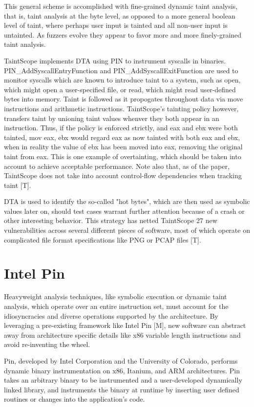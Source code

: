 \documentclass[11pt,expanded,copyright]{fsuthesis}
\begin{document}
This general scheme is accomplished with fine-grained dynamic taint analysis, that is, taint analysis at the byte level, as opposed to a more general boolean level of taint, where perhaps user input is tainted and all non-user input is untainted. As fuzzers evolve they appear to favor more and more finely-grained taint analysis.

TaintScope implements DTA using PIN to instrument syscalls in binaries. PIN\_AddSyscallEntryFunction and PIN\_AddSyscallExitFunction are used to monitor syscalls which are known to introduce taint to a system, such as open, which might open a user-specified file, or read, which might read user-defined bytes into memory. Taint is followed as it propogates throughout data via move instructions and arithmetic instructions. TaintScope's tainting policy however, transfers taint by unioning taint values whenver they both appear in an instruction. Thus, if the policy is enforced strictly, and eax and ebx were both tainted, mov eax, ebx would regard eax as now tainted with both eax and ebx, when in reality the value of ebx has been moved into eax, removing the original taint from eax. This is one example of overtainting, which should be taken into account to achieve acceptable performance. Note also that, as of the paper, TaintScope does not take into account control-flow dependencies when tracking taint [T].

DTA is used to identify the so-called "hot bytes", which are then used as symbolic values later on, should test cases warrant further attention because of a crash or other interesting behavior. This strategy has netted TaintScope 27 new vulnerabilities across several different pieces of software, most of which operate on complicated file format specifications like PNG or PCAP files [T].

\section{Intel Pin}

Heavyweight analysis techniques, like symbolic execution or dynamic taint analysis, which operate over an entire instruction set, must account for the idiosyncracies and diverse operations supported by the architecture. By leveraging a pre-existing framework like Intel Pin [M], new software can abstract away from architecture specific details like x86 variable length instructions and avoid re-inventing the wheel.

Pin, developed by Intel Corporation and the University of Colorado, performs dynamic binary instrumentation on x86, Itanium, and ARM architectures. Pin takes an arbitrary binary to be instrumented and a user-developed dynamically linked library, and instruments the binary at runtime by inserting user defined routines or changes into the application's code.
\end{document}

